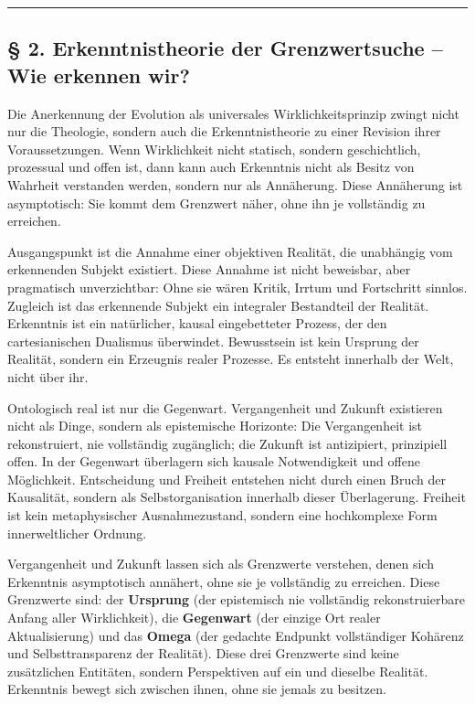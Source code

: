 \documentclass[
  ngerman,
]{article}
\begin{document}
\begin{center}\rule{0.5\linewidth}{0.5pt}\end{center}

\subsection{§ 2. Erkenntnistheorie der Grenzwertsuche -- Wie erkennen
wir?}\label{erkenntnistheorie-der-grenzwertsuche-wie-erkennen-wir}

Die Anerkennung der Evolution als universales Wirklichkeitsprinzip
zwingt nicht nur die Theologie, sondern auch die Erkenntnistheorie zu
einer Revision ihrer Voraussetzungen. Wenn Wirklichkeit nicht statisch,
sondern geschichtlich, prozessual und offen ist, dann kann auch
Erkenntnis nicht als Besitz von Wahrheit verstanden werden, sondern nur
als Annäherung. Diese Annäherung ist asymptotisch: Sie kommt dem
Grenzwert näher, ohne ihn je vollständig zu erreichen.

Ausgangspunkt ist die Annahme einer objektiven Realität, die unabhängig
vom erkennenden Subjekt existiert. Diese Annahme ist nicht beweisbar,
aber pragmatisch unverzichtbar: Ohne sie wären Kritik, Irrtum und
Fortschritt sinnlos. Zugleich ist das erkennende Subjekt ein integraler
Bestandteil der Realität. Erkenntnis ist ein natürlicher, kausal
eingebetteter Prozess, der den cartesianischen Dualismus überwindet.
Bewusstsein ist kein Ursprung der Realität, sondern ein Erzeugnis realer
Prozesse. Es entsteht innerhalb der Welt, nicht über ihr.

Ontologisch real ist nur die Gegenwart. Vergangenheit und Zukunft
existieren nicht als Dinge, sondern als epistemische Horizonte: Die
Vergangenheit ist rekonstruiert, nie vollständig zugänglich; die Zukunft
ist antizipiert, prinzipiell offen. In der Gegenwart überlagern sich
kausale Notwendigkeit und offene Möglichkeit. Entscheidung und Freiheit
entstehen nicht durch einen Bruch der Kausalität, sondern als
Selbstorganisation innerhalb dieser Überlagerung. Freiheit ist kein
metaphysischer Ausnahmezustand, sondern eine hochkomplexe Form
innerweltlicher Ordnung.

Vergangenheit und Zukunft lassen sich als Grenzwerte verstehen, denen
sich Erkenntnis asymptotisch annähert, ohne sie je vollständig zu
erreichen. Diese Grenzwerte sind: der \textbf{Ursprung} (der epistemisch
nie vollständig rekonstruierbare Anfang aller Wirklichkeit), die
\textbf{Gegenwart} (der einzige Ort realer Aktualisierung) und das
\textbf{Omega} (der gedachte Endpunkt vollständiger Kohärenz und
Selbsttransparenz der Realität). Diese drei Grenzwerte sind keine
zusätzlichen Entitäten, sondern Perspektiven auf ein und dieselbe
Realität. Erkenntnis bewegt sich zwischen ihnen, ohne sie jemals zu
besitzen.
\end{document}
